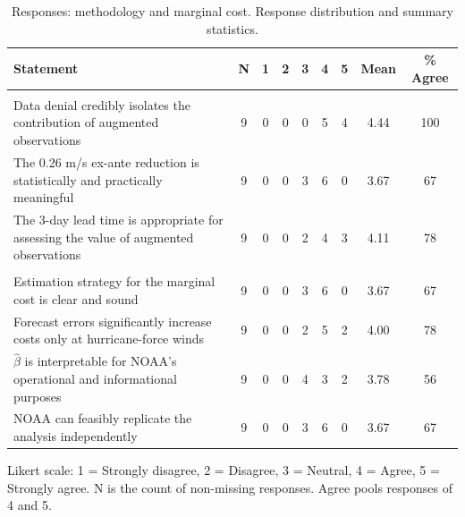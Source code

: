 \begin{table}[!h]

\caption{\label{tab:appD_likert_part1}Responses: methodology and marginal cost. Response distribution and summary statistics.}
\centering
\begin{threeparttable}
\begin{tabular}[t]{lcccccccc}
\toprule
Statement & N & 1 & 2 & 3 & 4 & 5 & Mean & \% Agree\\
\midrule
\addlinespace[0.3em]
\multicolumn{9}{l}{\textbf{Methodology}}\\
\hspace{1em}Data denial credibly isolates the contribution of augmented observations & 9 & 0 & 0 & 0 & 5 & 4 & 4.44 & 100\\
\hspace{1em}The 0.26 m/s ex-ante reduction is statistically and practically meaningful & 9 & 0 & 0 & 3 & 6 & 0 & 3.67 & 67\\
\hspace{1em}The 3-day lead time is appropriate for assessing the value of augmented observations & 9 & 0 & 0 & 2 & 4 & 3 & 4.11 & 78\\
\addlinespace[0.3em]
\multicolumn{9}{l}{\textbf{Cost curvature}}\\
\hspace{1em}Estimation strategy for the marginal cost is clear and sound & 9 & 0 & 0 & 3 & 6 & 0 & 3.67 & 67\\
\hspace{1em}Forecast errors significantly increase costs only at hurricane-force winds & 9 & 0 & 0 & 2 & 5 & 2 & 4.00 & 78\\
\hspace{1em}$\hat{\beta}$ is interpretable for NOAA's operational and informational purposes & 9 & 0 & 0 & 4 & 3 & 2 & 3.78 & 56\\
\hspace{1em}NOAA can feasibly replicate the analysis independently & 9 & 0 & 0 & 3 & 6 & 0 & 3.67 & 67\\
\bottomrule
\end{tabular}
\begin{tablenotes}[para]
\item Likert scale: 1 = Strongly disagree, 2 = Disagree, 3 = Neutral, 4 = Agree, 5 = Strongly agree. N is the count of non-missing responses. Agree pools responses of 4 and 5.
\end{tablenotes}
\end{threeparttable}
\end{table}
